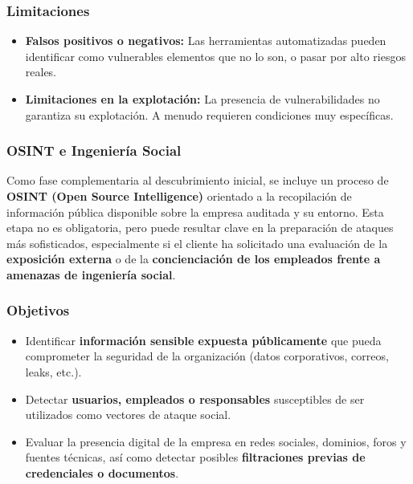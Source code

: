 \documentclass[a4paper, 11pt]{article}
\begin{document}
\vspace{0.5cm}
\subsubsection*{Limitaciones}

\begin{itemize}
    \item \textbf{Falsos positivos o negativos:} Las herramientas automatizadas pueden identificar como vulnerables elementos que no lo son, o pasar por alto riesgos reales.
    
    \item \textbf{Limitaciones en la explotación:} La presencia de vulnerabilidades no garantiza su explotación. A menudo requieren condiciones muy específicas.
\end{itemize}


\par\vspace{0.5cm}






\subsubsection{OSINT e Ingeniería Social}

Como fase complementaria al descubrimiento inicial, se incluye un proceso de \textbf{OSINT (Open Source Intelligence)} orientado a la recopilación de información pública disponible sobre la empresa auditada y su entorno. Esta etapa no es obligatoria, pero puede resultar clave en la preparación de ataques más sofisticados, especialmente si el cliente ha solicitado una evaluación de la \textbf{exposición externa} o de la \textbf{concienciación de los empleados frente a amenazas de ingeniería social}.

\vspace{0.5cm}
\subsubsection*{Objetivos}

\begin{itemize}
    \item Identificar \textbf{información sensible expuesta públicamente} que pueda comprometer la seguridad de la organización (datos corporativos, correos, leaks, etc.).
    \item Detectar \textbf{usuarios, empleados o responsables} susceptibles de ser utilizados como vectores de ataque social.
    \item Evaluar la presencia digital de la empresa en redes sociales, dominios, foros y fuentes técnicas, así como detectar posibles \textbf{filtraciones previas de credenciales o documentos}.
\end{itemize}
\end{document}
